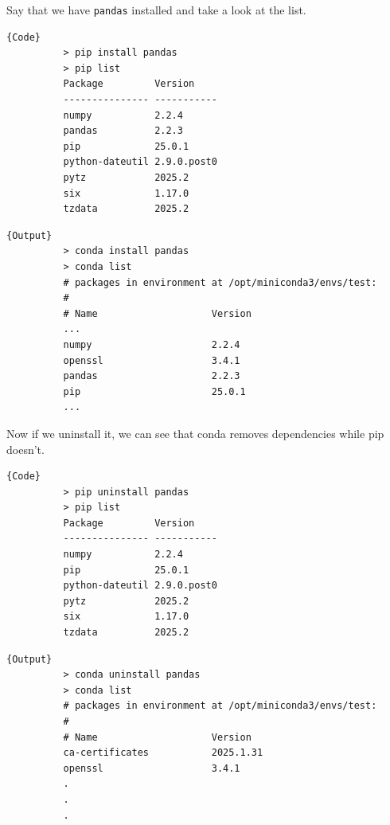 \documentclass{article}
\begin{document}
    \begin{example}
      Say that we have \texttt{pandas} installed and take a look at the list.
      
      \noindent\begin{minipage}{.35\textwidth}
        \begin{lstlisting}[]{Code}
          > pip install pandas 
          > pip list 
          Package         Version
          --------------- -----------
          numpy           2.2.4
          pandas          2.2.3
          pip             25.0.1
          python-dateutil 2.9.0.post0
          pytz            2025.2
          six             1.17.0
          tzdata          2025.2
        \end{lstlisting}
        \end{minipage}
        \hfill
        \begin{minipage}{.64\textwidth}
        \begin{lstlisting}[]{Output}
          > conda install pandas 
          > conda list
          # packages in environment at /opt/miniconda3/envs/test:
          #
          # Name                    Version       
          ...
          numpy                     2.2.4         
          openssl                   3.4.1         
          pandas                    2.2.3         
          pip                       25.0.1        
          ...
        \end{lstlisting}
      \end{minipage}

      Now if we uninstall it, we can see that conda removes dependencies while pip doesn't. 

      \noindent\begin{minipage}{.35\textwidth}
        \begin{lstlisting}[]{Code}
          > pip uninstall pandas 
          > pip list
          Package         Version
          --------------- -----------
          numpy           2.2.4
          pip             25.0.1
          python-dateutil 2.9.0.post0
          pytz            2025.2
          six             1.17.0
          tzdata          2025.2
        \end{lstlisting}
        \end{minipage}
        \hfill
        \begin{minipage}{.64\textwidth}
        \begin{lstlisting}[]{Output}
          > conda uninstall pandas 
          > conda list
          # packages in environment at /opt/miniconda3/envs/test:
          #
          # Name                    Version        
          ca-certificates           2025.1.31      
          openssl                   3.4.1          
          .
          .
          .
        \end{lstlisting}
      \end{minipage}
    \end{example} 
\end{document}
